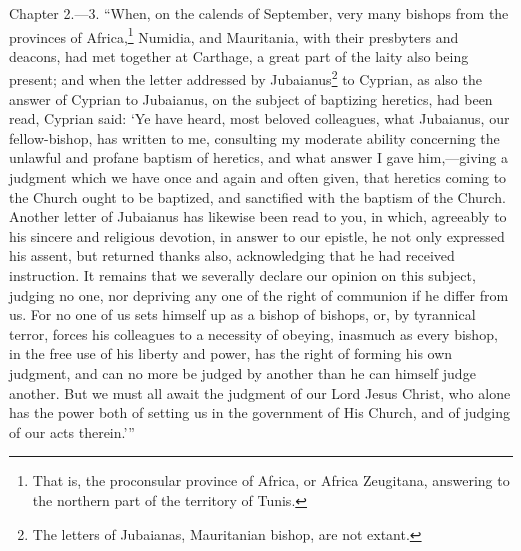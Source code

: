 Chapter 2.—3. ``When, on the calends of September, very many bishops from the provinces of Africa,\footnote{\par  That is, the proconsular province of Africa, or Africa Zeugitana, answering to the northern part of the territory of Tunis.} Numidia, and Mauritania, with their presbyters and deacons, had met together at Carthage, a great part of the laity also being present; and when the letter addressed by Jubaianus\footnote{\par  The letters of Jubaianas, Mauritanian bishop, are not extant.} to Cyprian, as also the answer of Cyprian to Jubaianus, on the subject of baptizing heretics, had been read, Cyprian said: ‘Ye have heard, most beloved colleagues, what Jubaianus, our fellow-bishop, has written to me, consulting my moderate ability concerning the unlawful and profane baptism of heretics, and what answer I gave him,—giving a judgment which we have once and again and often given, that heretics coming to the Church ought to be baptized, and sanctified with the baptism of the Church. Another letter of Jubaianus has likewise been read to you, in which, agreeably to his sincere and religious devotion, in answer to our epistle, he not only expressed his assent, but returned thanks also, acknowledging that he had received instruction. It remains that we severally declare our opinion on this subject, judging no one, nor depriving any one of the right of communion if he differ from us. For no one of us sets himself up as a bishop of bishops, or, by tyrannical terror, forces his colleagues to a necessity of obeying, inasmuch as every bishop, in the free use of his liberty and power, has the right of forming his own judgment, and can no more be judged by another than he can himself judge another. But we must all await the judgment of our Lord Jesus Christ, who alone has the power both of setting us in the government of His Church, and of judging of our acts therein.’''


